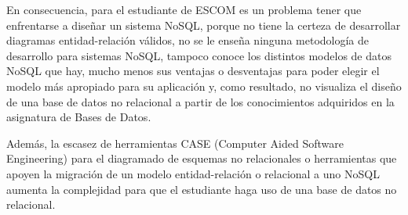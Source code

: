 En consecuencia, para el estudiante de ESCOM es un problema tener que enfrentarse a diseñar un sistema NoSQL, porque no tiene la certeza de desarrollar diagramas entidad-relación válidos, no se le enseña ninguna metodología de desarrollo para sistemas NoSQL, tampoco conoce los distintos modelos de datos NoSQL que hay, mucho menos sus ventajas o desventajas para poder elegir el modelo más apropiado para su aplicación y, como resultado, no visualiza el diseño de una base de datos no relacional a partir de los conocimientos adquiridos en la asignatura de Bases de Datos.


Además, la escasez de herramientas CASE (Computer Aided Software Engineering) para el diagramado de esquemas no relacionales o herramientas que apoyen la migración de un modelo entidad-relación o relacional a uno NoSQL aumenta la complejidad para que el estudiante haga uso de una base de datos no relacional.
